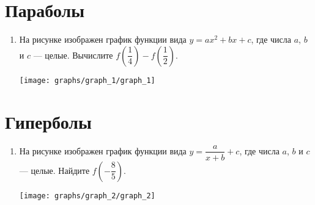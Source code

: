 \documentclass[10pt, a4paper]{article}
\begin{document}
\section{Параболы}
\begin{enumerate}
	\item
	\begin{minipage}[t][8cm][t]{0.5\textwidth}
		На рисунке изображен график функции вида $y=ax^2+bx+c$, где числа $a$, $b$ и $c$ — целые. Вычислите $f\left(\dfrac{1}{4}\right)-f\left(\dfrac{1}{2}\right)$.
		\begin{flushright}
		\end{flushright}
	\end{minipage}
	\begin{minipage}[t][8cm][t]{0.5\textwidth}
		\hspace{10pt}
		\texttt{[image: graphs/graph\_1/graph\_1]}
	\end{minipage}
\end{enumerate}
\section{Гиперболы}
\begin{enumerate}
	\item 
	\begin{minipage}[t][8cm][t]{0.5\textwidth}
		На рисунке изображен график функции вида $y=\dfrac{a}{x+b}+c$, где числа $a$, $b$ и $c$ — целые. Найдите $f\left(-\dfrac{8}{5}\right)$.
		\begin{flushright}
			\rotatebox{180}{\fbox{$-1\dfrac{1}{3}$}}
		\end{flushright}
	\end{minipage}
	\begin{minipage}[t][8cm][t]{0.5\textwidth}
		\hspace{10pt}
		\texttt{[image: graphs/graph\_2/graph\_2]}
	\end{minipage}
	
\end{enumerate}
\end{document}
